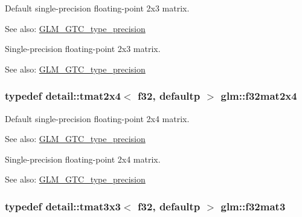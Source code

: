 Default single-precision floating-point 2x3 matrix. \begin{Desc}
\item[See also:]\hyperlink{group__gtc__type__precision}{GLM\_\-GTC\_\-type\_\-precision}\end{Desc}
Single-precision floating-point 2x3 matrix. \begin{Desc}
\item[See also:]\hyperlink{group__gtc__type__precision}{GLM\_\-GTC\_\-type\_\-precision} \end{Desc}
\hypertarget{group__gtc__type__precision_gba05bfeff59b12ea8e8ad2f6bfd8eece}{
\subsubsection[f32mat2x4]{\setlength{\rightskip}{0pt plus 5cm}typedef detail::tmat2x4$<$ f32, defaultp $>$ {\bf glm::f32mat2x4}}}
\label{group__gtc__type__precision_gba05bfeff59b12ea8e8ad2f6bfd8eece}


Default single-precision floating-point 2x4 matrix. \begin{Desc}
\item[See also:]\hyperlink{group__gtc__type__precision}{GLM\_\-GTC\_\-type\_\-precision}\end{Desc}
Single-precision floating-point 2x4 matrix. \begin{Desc}
\item[See also:]\hyperlink{group__gtc__type__precision}{GLM\_\-GTC\_\-type\_\-precision} \end{Desc}
\hypertarget{group__gtc__type__precision_gf8d666dea6f652c21f0c1515ce522090}{
\subsubsection[f32mat3]{\setlength{\rightskip}{0pt plus 5cm}typedef detail::tmat3x3$<$ f32, defaultp $>$ {\bf glm::f32mat3}}}
\label{group__gtc__type__precision_gf8d666dea6f652c21f0c1515ce522090}



